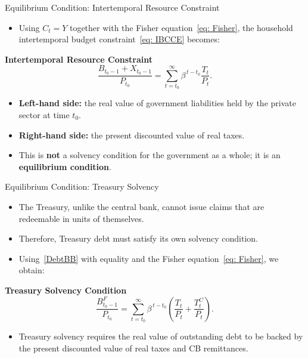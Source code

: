 \documentclass[11pt,aspectratio=169]{beamer}
\begin{document}
\begin{frame}{Equilibrium Condition: Intertemporal Resource Constraint}
\small

\begin{itemize}
  \item Using $C_t=Y$ together with the Fisher equation~\eqref{eq: Fisher}, the household intertemporal budget constraint~\eqref{eq: IBCCE} becomes:
\end{itemize}

\vspace{0.2cm}
\noindent\textbf{Intertemporal Resource Constraint}
\begin{equation}
\frac{B_{t_0-1}+X_{t_0-1}}{P_{t_0}}
=
\sum_{t=t_0}^{\infty}\beta^{\,t-t_0}\frac{T_t}{P_t}.
\label{eq: IBCTT}
\end{equation}

\begin{itemize}
  \item \textbf{Left-hand side:} the real value of government liabilities held by the private sector at time $t_0$.
  \item \textbf{Right-hand side:} the present discounted value of real taxes.
  \item This is \textbf{not} a solvency condition for the government as a whole; it is an \textbf{equilibrium condition}.
\end{itemize}

\end{frame}



\begin{frame}{Equilibrium Condition: Treasury Solvency}
\small

\begin{itemize}
  \item The Treasury, unlike the central bank, cannot issue claims that are redeemable in units of themselves.
  \item Therefore, Treasury debt must satisfy its own solvency condition.
  \item Using~\eqref{DebtBB} with equality and the Fisher equation~\eqref{eq: Fisher}, we obtain:
\end{itemize}

\vspace{0.2cm}
\noindent\textbf{Treasury Solvency Condition}
\begin{equation}
\frac{B_{t_0-1}^{F}}{P_{t_0}}
=
\sum_{t=t_0}^{\infty}\beta^{\,t-t_0}
\left(\frac{T_t}{P_t}+\frac{T_t^{C}}{P_t}\right).
\label{eq: TreasurySolvency}
\end{equation}

\begin{itemize}
  \item Treasury solvency requires the real value of outstanding debt to be backed by the present discounted value of real taxes and CB remittances.
\end{itemize}

\end{frame}
\end{document}
